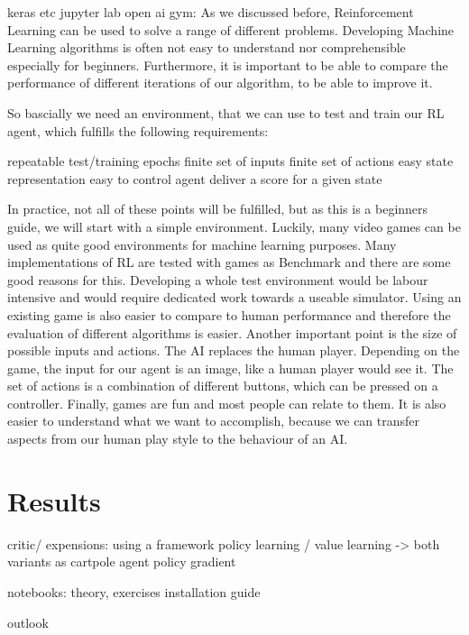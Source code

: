 \documentclass[a4paper]{article}
\begin{document}
	keras etc
	jupyter lab
	open ai gym: 
		As we discussed before, Reinforcement Learning can be used to solve a range of different problems. Developing Machine Learning algorithms is often not easy to understand nor comprehensible especially for beginners. Furthermore, it is important to be able to compare the performance of different iterations of our algorithm, to be able to improve it.
		
		So bascially we need an environment, that we can use to test and train our RL agent, which fulfills the following requirements:
		
		repeatable test/training epochs
		finite set of inputs
		finite set of actions
		easy state representation
		easy to control agent
		deliver a score for a given state
		
		In practice, not all of these points will be fulfilled, but as this is a beginners guide, we will start with a simple environment. Luckily, many video games can be used as quite good environments for machine learning purposes. Many implementations of RL are tested with games as Benchmark and there are some good reasons for this. Developing a whole test environment would be labour intensive and would require dedicated work towards a useable simulator. Using an existing game is also easier to compare to human performance and therefore the evaluation of different algorithms is easier. Another important point is the size of possible inputs and actions. The AI replaces the human player. Depending on the game, the input for our agent is an image, like a human player would see it. The set of actions is a combination of different buttons, which can be pressed on a controller. Finally, games are fun and most people can relate to them. It is also easier to understand what we want to accomplish, because we can transfer aspects from our human play style to the behaviour of an AI. 

	
	\section{Results}
	critic/ expensions:
		using a framework
		policy learning / value learning -> both variants as cartpole agent
		policy gradient
	
	notebooks:
		theory, exercises
	installation guide
	
	outlook
	
	
\end{document}
